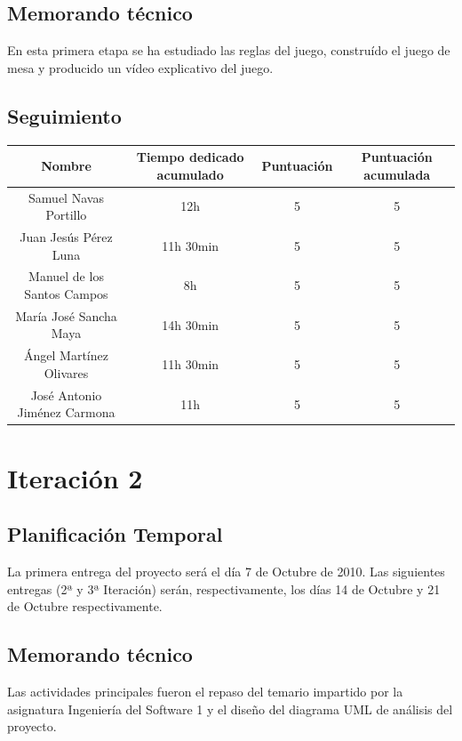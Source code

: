 \documentclass[11 pt]{book}
\begin{document}
	\section{Memorando técnico}
		En esta primera etapa se ha estudiado las reglas del juego, construído el juego de mesa y producido un vídeo explicativo del juego.
		
	\section{Seguimiento}
		\begin{tabular}{|c|c|c|c|}
			\hline
			Nombre & Tiempo dedicado acumulado & Puntuación & Puntuación acumulada\\
			\hline
			Samuel Navas Portillo & 12h & 5 & 5\\
			Juan Jesús Pérez Luna & 11h 30min & 5 & 5\\
			Manuel de los Santos Campos & 8h & 5 & 5\\
			María José Sancha Maya & 14h 30min & 5 & 5\\
			Ángel Martínez Olivares & 11h 30min & 5 & 5\\
			José Antonio Jiménez Carmona & 11h & 5 & 5\\
			\hline
		\end{tabular}
		
\chapter{Iteración 2}
	\section{Planificación Temporal}
		La primera entrega del proyecto será el día 7 de Octubre de 2010. Las siguientes entregas (2ª y 3ª Iteración) serán, respectivamente, los días 14 de Octubre y 21 de Octubre respectivamente.
		
	\section{Memorando técnico}
		Las actividades principales fueron el repaso del temario impartido por la asignatura Ingeniería del Software 1 y el diseño del diagrama UML de análisis del proyecto.
		
\end{document}
